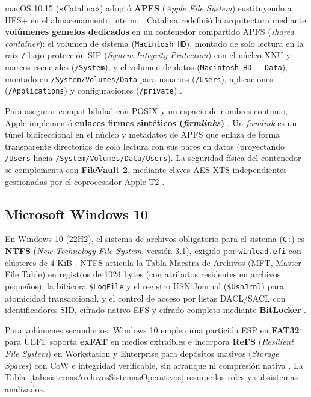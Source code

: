 \documentclass[12pt]{article}
\begin{document}
macOS 10.15 («Catalina») adoptó \textbf{APFS} (\textit{Apple File System}) sustituyendo a HFS+ en el almacenamiento interno \parencite{apple2020apfs}. Catalina redefinió la arquitectura mediante \textbf{volúmenes gemelos dedicados} en un contenedor compartido APFS (\textit{shared container}): el volumen de sistema (\texttt{Macintosh HD}), montado de solo lectura en la raíz \texttt{/} bajo protección SIP (\textit{System Integrity Protection}) con el núcleo XNU y marcos esenciales (\texttt{/System}); y el volumen de datos (\texttt{Macintosh HD - Data}), montado en \texttt{/System/}\allowbreak\texttt{Volumes/}\allowbreak\texttt{Data} para usuarios (\texttt{/Users}), aplicaciones (\texttt{/Applications}) y configuraciones (\texttt{/private}) \parencite{apple2020apfs}.

Para asegurar compatibilidad con POSIX y un espacio de nombres continuo, Apple implementó \textbf{enlaces firmes sintéticos (\textit{firmlinks})} \parencite{apple2020apfs}. Un \textit{firmlink} es un túnel bidireccional en el núcleo y metadatos de APFS que enlaza de forma transparente directorios de solo lectura con sus pares en datos (proyectando \texttt{/Users} hacia \texttt{/System/}\allowbreak\texttt{Volumes/}\allowbreak\texttt{Data/}\allowbreak\texttt{Users}). La seguridad física del contenedor se complementa con \textbf{FileVault 2}, mediante claves AES-XTS independientes gestionadas por el coprocesador Apple T2 \parencite{apple2020apfs}.

\subsection{Microsoft Windows 10}
\label{subsec:microsoftWindows10}

En Windows 10 (22H2), el sistema de archivos obligatorio para el sistema (\texttt{C:}) es \textbf{NTFS} (\textit{New Technology File System}, versión 3.1), exigido por \texttt{winload.efi} con clústeres de 4 KiB \parencite{microsoft2024ntfs}. NTFS articula la Tabla Maestra de Archivos (MFT, Master File Table) en registros de 1024 bytes (con atributos residentes en archivos pequeños), la bitácora \texttt{\$LogFile} y el registro USN Journal (\texttt{\$UsnJrnl}) para atomicidad transaccional, y el control de acceso por listas DACL/SACL con identificadores SID, cifrado nativo EFS y cifrado completo mediante \textbf{BitLocker} \parencite{microsoft2024ntfs, stallings2018operating}.

Para volúmenes secundarios, Windows 10 emplea una partición ESP en \textbf{FAT32} para UEFI, soporta \textbf{exFAT} en medios extraíbles e incorpora \textbf{ReFS} (\textit{Resilient File System}) en Workstation y Enterprise para depósitos masivos (\textit{Storage Spaces}) con CoW e integridad verificable, sin arranque ni compresión nativa \parencite{microsoft2024refs}. La Tabla~\ref{tab:sistemasArchivosSistemasOperativos} resume los roles y subsistemas analizados.
\end{document}
